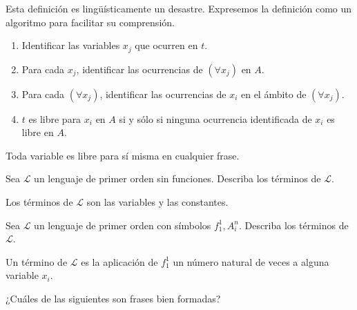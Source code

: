 \begin{remark}
Esta definición es lingüísticamente un desastre. Expresemos la definición como un algoritmo para facilitar su comprensión.
\end{remark}

\begin{algorithm}
\leavevmode
\begin{enumerate}
    \item Identificar las variables $x_j$ que ocurren en $t$.
    \item Para cada $x_j$, identificar las ocurrencias de $(\forall x_j)$ en $A$.
    \item Para cada $(\forall x_j)$, identificar las ocurrencias de $x_i$ en el ámbito de $(\forall x_j)$.
    \item $t$ es libre para $x_i$ en $A$ si y sólo si ninguna ocurrencia identificada de $x_i$ es libre en $A$.
\end{enumerate}
\end{algorithm}

\begin{remark}
Toda variable es libre para sí misma en cualquier frase.
\end{remark}

\setcounter{exercise}{3}
\begin{exercise}
Sea $\mathscr L$ un lenguaje de primer orden sin funciones. Describa los términos de $\mathscr L$.
\end{exercise}

\begin{solution}
Los términos de $\mathscr L$ son las variables y las constantes.
\end{solution}

\begin{exercise}
Sea $\mathscr L$ un lenguaje de primer orden con símbolos $f_1^1, A_i^n$. Describa los términos de $\mathscr L$.
\end{exercise}

\begin{solution}
Un término de $\mathscr L$ es la aplicación de $f_1^1$ un número natural de veces a alguna variable $x_i$.
\end{solution}

\begin{exercise}
¿Cuáles de las siguientes son frases bien formadas?
\end{exercise}

